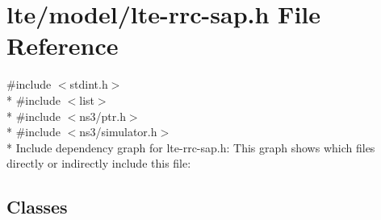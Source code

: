 \hypertarget{lte-rrc-sap_8h}{}\section{lte/model/lte-\/rrc-\/sap.h File Reference}
\label{lte-rrc-sap_8h}
{\ttfamily \#include $<$stdint.\+h$>$}\\*
{\ttfamily \#include $<$list$>$}\\*
{\ttfamily \#include $<$ns3/ptr.\+h$>$}\\*
{\ttfamily \#include $<$ns3/simulator.\+h$>$}\\*
Include dependency graph for lte-\/rrc-\/sap.h\+:
This graph shows which files directly or indirectly include this file\+:
\subsection*{Classes}

